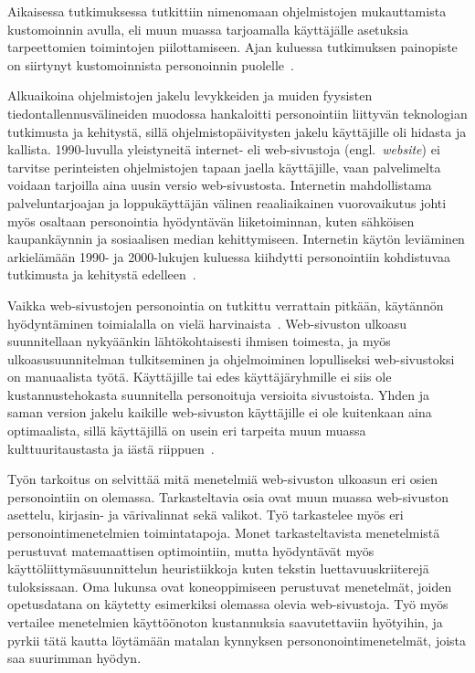 \documentclass[finnish, 12pt, a4paper, elec, utf8, a-1b, online]{aaltothesis}
\begin{document}
Aikaisessa tutkimuksessa tutkittiin nimenomaan ohjelmistojen mukauttamista
kustomoinnin avulla, eli muun muassa tarjoamalla käyttäjälle asetuksia
tarpeettomien toimintojen piilottamiseen. Ajan kuluessa tutkimuksen painopiste
on siirtynyt kustomoinnista personoinnin puolelle~\cite{viite?}.

Alkuaikoina ohjelmistojen jakelu levykkeiden ja muiden fyysisten
tiedontallennusvälineiden muodossa hankaloitti personointiin liittyvän
teknologian tutkimusta ja kehitystä, sillä ohjelmistopäivitysten jakelu
käyttäjille oli hidasta ja kallista. 1990-luvulla yleistyneitä internet- eli
web-sivustoja (engl.\ \textit{website}) ei tarvitse perinteisten ohjelmistojen
tapaan jaella käyttäjille, vaan palvelimelta voidaan tarjoilla aina uusin versio
web-sivustosta. Internetin mahdollistama palveluntarjoajan ja loppukäyttäjän
välinen reaaliaikainen vuorovaikutus johti myös osaltaan personointia
hyödyntävän liiketoiminnan, kuten sähköisen kaupankäynnin ja sosiaalisen median
kehittymiseen. Internetin käytön leviäminen arkielämään 1990- ja 2000-lukujen
kuluessa kiihdytti personointiin kohdistuvaa tutkimusta ja kehitystä
edelleen~\cite{10.1108/03090560710737534}.

Vaikka web-sivustojen personointia on tutkittu verrattain pitkään, käytännön
hyödyntäminen toimialalla on vielä harvinaista~\cite{viite?}.
Web-sivuston ulkoasu suunnitellaan nykyäänkin lähtökohtaisesti ihmisen toimesta,
ja myös ulkoasusuunnitelman tulkitseminen ja ohjelmoiminen lopulliseksi
web-sivustoksi on manuaalista työtä. Käyttäjille tai edes käyttäjäryhmille ei
siis ole kustannustehokasta suunnitella personoituja versioita sivustoista.
Yhden ja saman version jakelu kaikille web-sivuston käyttäjille ei ole
kuitenkaan aina optimaalista, sillä käyttäjillä on usein eri tarpeita muun
muassa kulttuuritaustasta ja iästä riippuen~\cite{viite?}.

Työn tarkoitus on selvittää mitä menetelmiä web-sivuston ulkoasun eri osien
personointiin on olemassa. Tarkasteltavia osia ovat muun muassa web-sivuston
asettelu, kirjasin- ja värivalinnat sekä valikot. Työ tarkastelee myös eri
personointimenetelmien toimintatapoja. Monet tarkasteltavista menetelmistä
perustuvat matemaattisen optimointiin, mutta hyödyntävät myös
käyttöliittymäsuunnittelun heuristiikkoja kuten tekstin luettavuuskriiterejä
tuloksissaan. Oma lukunsa ovat koneoppimiseen perustuvat menetelmät, joiden
opetusdatana on käytetty esimerkiksi olemassa olevia web-sivustoja. Työ myös
vertailee menetelmien käyttöönoton kustannuksia saavutettaviin hyötyihin, ja
pyrkii tätä kautta löytämään matalan kynnyksen persononointimenetelmät, joista
saa suurimman hyödyn.
\end{document}
